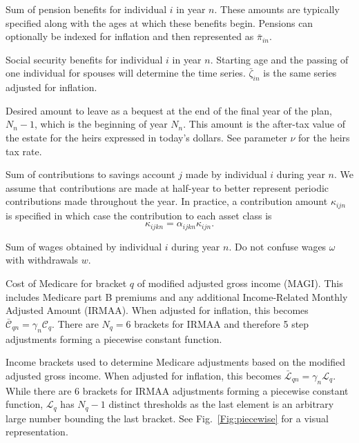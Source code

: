 \documentclass{report}[fleqn,12pt]
\begin{document}
\begin{description}[leftmargin=4em,style=multiline]
\item [$\pi_{in}$]
	Sum of pension benefits for individual $i$ in year $n$. These amounts are typically
	specified along with the ages at which these benefits begin.
	Pensions can optionally be indexed for inflation and then represented as $\bar{\pi}_{in}$.
\item [$\zeta_{in}$]
	Social security benefits for individual $i$ in year $n$. Starting age and the passing
	of one individual for spouses will determine the time series. $\bar{\zeta}_{in}$ is
	the same series adjusted for inflation.
\item [$\epsilon_{N_n}$]
	Desired amount to leave as a bequest at the end of the final year of the plan, $N_n-1$,
	which is the beginning of year $N_n$. This amount is the after-tax value of the estate
	for the heirs expressed in today's dollars. See parameter $\nu$ for the heirs tax rate.
\item [$\kappa_{ijn}$]
	Sum of contributions to savings account $j$ made by individual $i$ during year $n$.
	We assume that contributions are made at half-year to better represent periodic
        contributions made throughout the year.
	In practice, a contribution
	amount $\kappa_{ijn}$ is specified in which case the contribution to each asset
	class is
	\begin{equation}
		\kappa_{ijkn} = \alpha_{ijkn}\kappa_{ijn}.
	\end{equation}
\item [$\omega_{in}$]
	Sum of wages obtained by individual $i$ during year $n$.
	Do not confuse wages $\omega$ with withdrawals $w$.
\item [$\mathcal{C}_{q}$]
	Cost of Medicare for bracket $q$ of modified adjusted gross income (MAGI). This includes
	Medicare part B premiums and any additional
	Income-Related Monthly Adjusted Amount (IRMAA). When adjusted
	for inflation, this becomes $\bar{\mathcal{C}}_{qn} = \gamma_n\mathcal{C}_q$.
        There are $N_q = 6$ brackets for IRMAA and therefore 5 step adjustments forming
        a piecewise constant function.
\item [$\mathcal{L}_{q}$]
	Income brackets used to determine Medicare adjustments based on the modified adjusted gross income.
	When adjusted for inflation, this becomes $\bar{\mathcal{L}}_{qn} = \gamma_n\mathcal{L}_q$.
        While there are 6 brackets for IRMAA adjustments forming a piecewise constant function,
	$\mathcal{L}_q$ has $N_q - 1$ distinct thresholds as the last element is an arbitrary large
        number bounding the last bracket. See Fig.~\ref{Fig:piecewise} for a visual representation.

\end{description}
\end{document}
